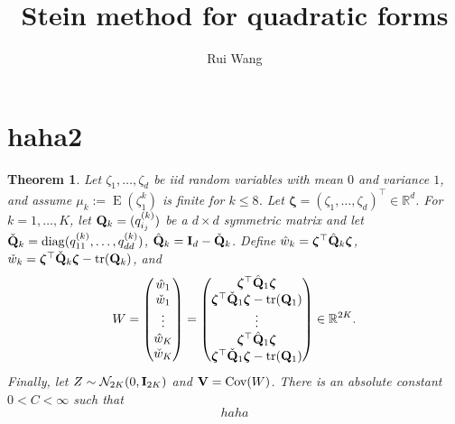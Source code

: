 \documentclass[11pt]{article}
\title{
    Stein method for quadratic forms
}
\author[1]{Rui Wang}
\DeclareMathOperator{\mytr}{tr}
\DeclareMathOperator{\mydiag}{diag}
\DeclareMathOperator{\myE}{E}
\DeclareMathOperator{\myCov}{Cov}
\newcommand{\bfsym}[1]{\ensuremath{\boldsymbol{#1}}}
\def\bzeta{\bfsym {\zeta}}
\theoremstyle{plain}
\newtheorem{theorem}{\quad\quad Theorem}
\theoremstyle{definition}
\theoremstyle{remark}
\begin{document}
\maketitle
    \section{haha2}
\begin{theorem}
    Let $\zeta_1,\ldots,\zeta_d$ be iid random variables with mean $0$ and variance $1$, and assume $\mu_k:= \myE (\zeta_1^k)$ is finite for $k\leq 8$.
    Let $\bzeta=(\zeta_1,\ldots,\zeta_d)^\top\in \mathbb R^d$.
    For $k=1,\ldots, K$, let $\mathbf{Q}_k=(q_{i_j}^{(k)})$ be a $d\times d$ symmetric matrix and let $\check\BQ_k=\mydiag(q_{11}^{(k)},\ldots, q_{dd}^{(k)})$, $\hat{\mathbf{Q}}_k=\mathbf{I}_d-\check{\mathbf{Q}}_k$.
    Define $\hat{w}_k= \bzeta^\top \hat\BQ_k \bzeta$, $\check w_k = \bzeta^\top \check \BQ_k \bzeta -\mytr(\BQ_k)$, and
\begin{equation*}
W=
    \begin{pmatrix}
   \hat w_1\\
   \check w_1\\
   \vdots\\
   \hat w_K\\
   \check w_K
    \end{pmatrix}
    =
    \begin{pmatrix}
        \bzeta^\top \hat \BQ_1 \bzeta
        \\
        \bzeta^\top \check \BQ_1 \bzeta -\mytr (\BQ_1)
        \\
        \vdots\\
        \bzeta^\top \hat \BQ_1 \bzeta
        \\
        \bzeta^\top \check \BQ_1 \bzeta -\mytr (\BQ_1)
        \\
    \end{pmatrix}
    \in \mathbb R^{2K}.
\end{equation*}
Finally, let $Z\sim \mathcal N_{2K} (0,\mathbf{I}_{2K})$ and $\BV = \myCov (W)$. 
There is an absolute constant $0<C<\infty$ such that
\begin{equation*}
    haha
\end{equation*}
\end{theorem}
\end{document}
